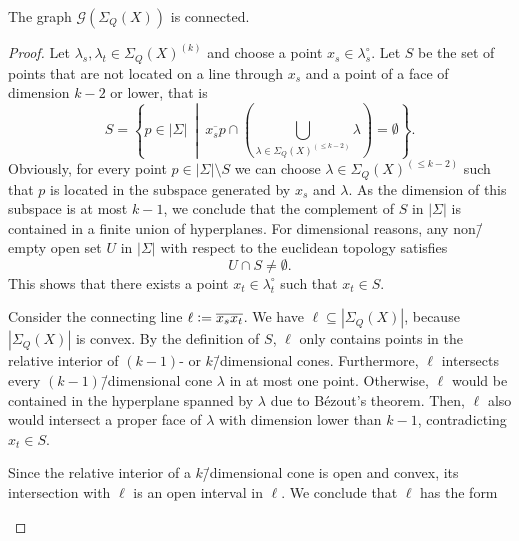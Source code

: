 \begin{prop}
	\label{proposition:git_fan_connected}
	The graph $\mathcal{G}(\Sigma_Q(X))$ is connected.
\end{prop}
\begin{proof}
	Let $\lambda_s, \lambda_t\in\Sigma_Q(X)^{(k)}$ and choose a point $x_s\in\lambda_s^\circ$. Let $S$ be the set of points that are not located on a line through $x_s$ and a point of a face of dimension $k-2$ or lower, that is
	$$S = \left\{p\in|\Sigma|\ \middle|\ \overline{x_s p} \cap \left(\bigcup_{\lambda\in\Sigma_Q(X)^{(\leq k-2)}} \lambda\right) = \emptyset\right\}.$$
	Obviously, for every point $p\in |\Sigma|\setminus S$ we can choose $\lambda\in\Sigma_Q(X)^{(\leq k-2)}$ such that $p$ is located in the subspace generated by $x_s$ and $\lambda$. As the dimension of this subspace is at most $k-1$, we conclude that the complement of $S$ in $|\Sigma|$ is contained in a finite union of hyperplanes.
	For dimensional reasons, any non\=/empty open set $U$ in $|\Sigma|$ with respect to the euclidean topology satisfies
	$$U\cap S \neq \emptyset.$$
	This shows that there exists a point $x_t\in\lambda_t^\circ$ such that $x_t\in S$.
	
	Consider the connecting line $\ell \mathrel{\mathop:}= \overline{x_s x_t}$. We have $\ell\subseteq|\Sigma_Q(X)|$, because $|\Sigma_Q(X)|$ is convex. By the definition of $S$, $\ell$ only contains points in the relative interior of $(k-1)$- or $k$\=/dimensional cones. Furthermore, $\ell$ intersects every $(k-1)$\=/dimensional cone $\lambda$ in at most one point. Otherwise, $\ell$ would be contained in the hyperplane spanned by $\lambda$ due to Bézout's theorem. Then, $\ell$ also would intersect a proper face of $\lambda$ with dimension lower than $k-1$, contradicting $x_t\in S$.
	
	Since the relative interior of a $k$\=/dimensional cone is open and convex, its intersection with $\ell$ is an open interval in $\ell$. We conclude that $\ell$ has the form
	
	\begin{center}
\end{center}
\end{proof}

